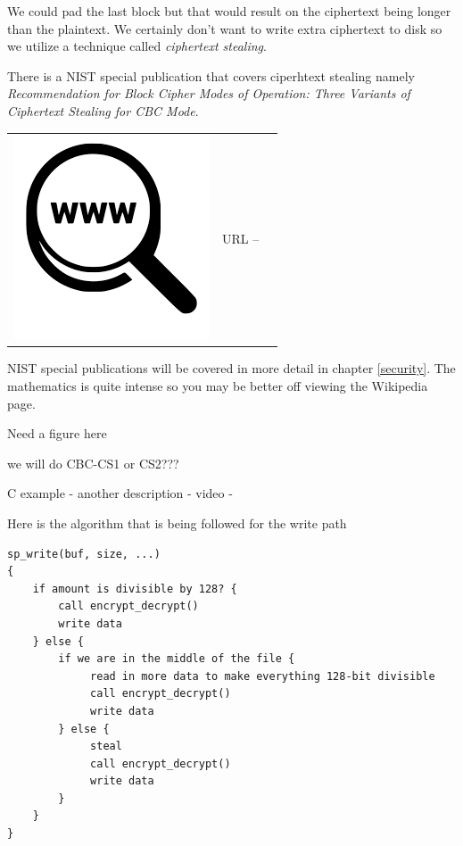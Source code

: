We could pad the last block but that would result on the ciphertext being longer than the plaintext. We certainly don't want to write extra ciphertext to disk so we utilize a technique called \textit{ciphertext stealing}. 

There is a NIST special publication that covers ciperhtext stealing namely \textit{Recommendation for Block Cipher Modes of Operation: Three Variants of Ciphertext Stealing for CBC Mode}. 

\begin{table}[h]
\begin{tabular}{lcl}
\parbox[r]{0.5in}{\includegraphics[scale=0.15]{figures/url.png}} & \parbox[l]{0.55in}{URL  -- } & \parbox[l]{3in}{}
\end{tabular}
\end{table}

\noindent
NIST special publications will be covered in more detail in chapter \ref{security}. The mathematics is quite intense so you may be better off viewing  the Wikipedia page.

Need a figure here 

we will do CBC-CS1 or CS2???

C example - %
another description - %
video - %

Here is the algorithm that is being followed for the write path

\begin{lstlisting}
sp_write(buf, size, ...)
{
    if amount is divisible by 128? {
        call encrypt_decrypt()
        write data
    } else {
        if we are in the middle of the file {
             read in more data to make everything 128-bit divisible
             call encrypt_decrypt()
             write data
        } else {
             steal
             call encrypt_decrypt()
             write data
        }
    }  
}
\end{lstlisting}


